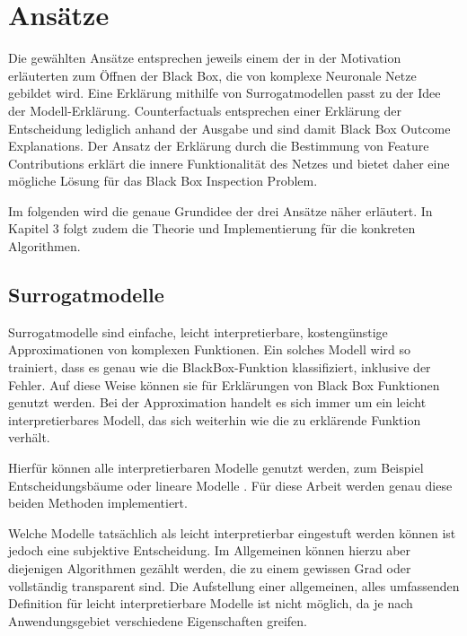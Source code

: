 \section{Ansätze}
\label{section: Methoden}
Die gewählten Ansätze entsprechen jeweils einem der in der Motivation erläuterten zum Öffnen der Black Box, die von komplexe Neuronale Netze gebildet wird. Eine Erklärung mithilfe von Surrogatmodellen passt zu der Idee der Modell-Erklärung. Counterfactuals entsprechen einer Erklärung der Entscheidung lediglich anhand der Ausgabe und sind damit Black Box Outcome Explanations. Der Ansatz der Erklärung durch die Bestimmung von Feature Contributions erklärt die innere Funktionalität des Netzes und bietet daher eine mögliche Lösung für das Black Box Inspection Problem. \cite{Guidotti}

Im folgenden wird die genaue Grundidee der drei Ansätze näher erläutert. In Kapitel 3 folgt zudem die Theorie und Implementierung für die konkreten Algorithmen.

\subsection{Surrogatmodelle}
\label{subsection: Surrogat}

Surrogatmodelle sind einfache, leicht interpretierbare, kostengünstige Approximationen von komplexen Funktionen. Ein solches Modell wird so trainiert, dass es genau wie die BlackBox-Funktion klassifiziert, inklusive der Fehler. Auf diese Weise können sie für Erklärungen von Black Box Funktionen genutzt werden. Bei der Approximation handelt es sich immer um ein leicht interpretierbares Modell, das sich weiterhin wie die zu erklärende Funktion verhält. \cite{InterpretableMLMolnar, TripathySurrogate}

Hierfür können alle interpretierbaren Modelle genutzt werden, zum Beispiel Entscheidungsbäume 
\cite{FrosstDecisionTree, TanSurrogate} oder lineare Modelle . Für diese Arbeit werden genau diese beiden Methoden implementiert.

Welche Modelle tatsächlich als leicht interpretierbar eingestuft werden können ist jedoch eine subjektive Entscheidung. Im Allgemeinen können hierzu aber diejenigen Algorithmen gezählt werden, die zu einem gewissen Grad oder vollständig transparent sind. \cite{RudinStopExplaining} Die Aufstellung einer allgemeinen, alles umfassenden Definition für leicht interpretierbare Modelle ist nicht möglich, da je nach Anwendungsgebiet verschiedene Eigenschaften greifen. \cite{RudinStopExplaining}

